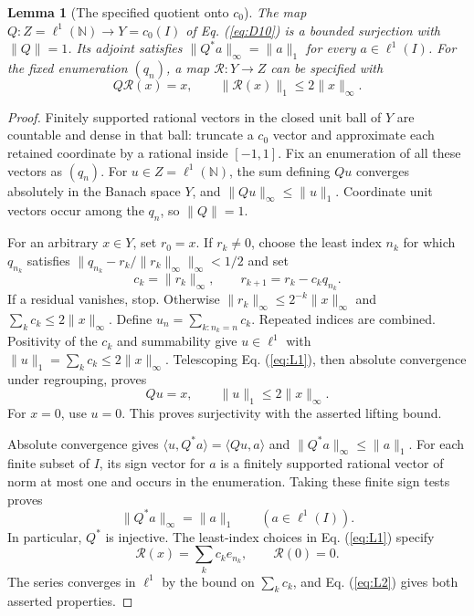 \documentclass[11pt]{article}
\newcommand{\N}{\mathbb N}
\newcommand{\pair}[2]{\langle #1,#2\rangle}
\newtheorem{lemma}{Lemma}
\theoremstyle{definition}
\theoremstyle{remark}
\begin{document}
\begin{lemma}[The specified quotient onto $c_0$]
\label{lem:specified-quotient}
The map $Q:Z=\ell^1(\N)\to Y=c_0(I)$ of Eq. (\ref{eq:D10}) is a bounded surjection with $\|Q\|=1$. Its adjoint satisfies $\|Q^*a\|_\infty=\|a\|_1$ for every $a\in\ell^1(I)$. For the fixed enumeration $(q_n)$, a map $\mathcal R:Y\to Z$ can be specified with
\[
Q\mathcal R(x)=x,\qquad \|\mathcal R(x)\|_1\le2\|x\|_\infty.
\]
\end{lemma}
\begin{proof}
\label{sec:L1}
Finitely supported rational vectors in the closed unit ball of $Y$ are countable and dense in that ball: truncate a $c_0$ vector and approximate each retained coordinate by a rational inside $[-1,1]$. Fix an enumeration of all these vectors as $(q_n)$. For $u\in Z=\ell^1(\N)$, the sum defining $Qu$ converges absolutely in the Banach space $Y$, and $\|Qu\|_\infty\le\|u\|_1$. Coordinate unit vectors occur among the $q_n$, so $\|Q\|=1$.

For an arbitrary $x\in Y$, set $r_0=x$. If $r_k\ne0$, choose the least index $n_k$ for which $q_{n_k}$ satisfies $\|q_{n_k}-r_k/\|r_k\|_\infty\|_\infty<1/2$ and set
\begin{equation}
c_k=\|r_k\|_\infty,\qquad r_{k+1}=r_k-c_kq_{n_k}.
\label{eq:L1}
\end{equation}
If a residual vanishes, stop. Otherwise $\|r_k\|_\infty\le2^{-k}\|x\|_\infty$ and $\sum_k c_k\le2\|x\|_\infty$. Define $u_n=\sum_{k:n_k=n}c_k$. Repeated indices are combined. Positivity of the $c_k$ and summability give $u\in\ell^1$ with $\|u\|_1=\sum_k c_k\le2\|x\|_\infty$. Telescoping Eq. (\ref{eq:L1}), then absolute convergence under regrouping, proves
\begin{equation}
Qu=x,\qquad \|u\|_1\le2\|x\|_\infty.
\label{eq:L2}
\end{equation}
For $x=0$, use $u=0$. This proves surjectivity with the asserted lifting bound.

\label{sec:L2}
Absolute convergence gives $\pair{u}{Q^*a}=\pair{Qu}{a}$ and $\|Q^*a\|_\infty\le\|a\|_1$. For each finite subset of $I$, its sign vector for $a$ is a finitely supported rational vector of norm at most one and occurs in the enumeration. Taking these finite sign tests proves
\begin{equation}
\|Q^*a\|_\infty=\|a\|_1\qquad(a\in\ell^1(I)).
\label{eq:L3}
\end{equation}
In particular, $Q^*$ is injective. The least-index choices in Eq. (\ref{eq:L1}) specify
\[
\mathcal R(x)=\sum_k c_k e_{n_k},\qquad \mathcal R(0)=0.
\]
The series converges in $\ell^1$ by the bound on $\sum_k c_k$, and Eq. (\ref{eq:L2}) gives both asserted properties.
\end{proof}
\end{document}
